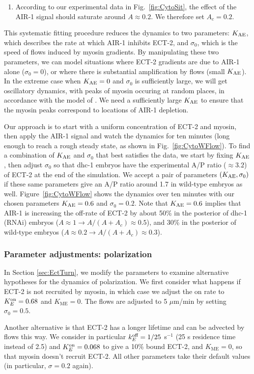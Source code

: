 \documentclass[11pt]{article}
\begin{document}
\begin{appendix}
\begin{enumerate}
\item According to our experimental data in Fig.\ \ref{fig:CytoSit}, the effect of the AIR-1 signal should saturate around $A \approx 0.2$. We therefore set $A_c=0.2$. 
\end{enumerate}
This systematic fitting procedure reduces the dynamics to two parameters: $K_\text{AE}$, which describes the rate at which AIR-1 inhibits ECT-2, and $\sigma_0$, which is the speed of flows induced by myosin gradients. By manipulating these two parameters, we can model situations where ECT-2 gradients are due to AIR-1 alone ($\sigma_0 = 0$), or where there is substantial amplification by flows (small $K_\text{AE}$). In the extreme case when $K_\text{AE}=0$ and $\sigma_0$ is sufficiently large, we will get oscillatory dynamics, with peaks of myosin occuring at random places, in accordance with the model of \cite{michaux2018excitable}. We need a sufficiently large $K_\text{AE}$ to ensure that the myosin peaks correspond to locations of AIR-1 depletion.

Our approach is to start with a uniform concentration of ECT-2 and myosin, then apply the AIR-1 signal and watch the dynamics for ten minutes (long enough to reach a rough steady state, as shown in Fig.\ \ref{fig:CytoWFlow}). To find a combination of $K_\text{AE}$ and $\sigma_0$ that best satisfies the data, we start by fixing $K_\text{AE}$, then adjust $\sigma_0$ so that dhc-1 embryos have the experimental A/P ratio ($\approx 3.2$) of ECT-2 at the end of the simulation. We accept a pair of parameters $\left(K_\text{AE},\sigma_0\right)$ if these same parameters give an A/P ratio around 1.7 in wild-type embryos as well. Figure\ \ref{fig:CytoWFlow} shows the dynamics over ten minutes with our chosen parameters $K_\text{AE}=0.6$ and $\sigma_0=0.2$. Note that $K_\text{AE}=0.6$ implies that AIR-1 is increasing the off-rate of ECT-2 by about 50\% in the posterior of dhc-1 (RNAi) embryos ($A \approx 1 \rightarrow A/(A+A_c) \approx 0.5$), and 30\% in the posterior of wild-type embryos ($A \approx 0.2 \rightarrow A/(A+A_c) \approx 0.3$).

\subsubsection{Parameter adjustments: polarization \label{sec:EctTurnP}}
In Section \ref{sec:EctTurn}, we modify the parameters to examine alternative hypotheses for the dynamics of polarization. We first consider what happens if ECT-2 is not recruited by myosin, in which case we adjust the on rate to $K^\text{on}_E=0.68$ and $K_\text{ME}=0$. The flows are adjusted to 5 $\mu$m/min by setting $\sigma_0=0.5$. 

Another alternative is that ECT-2 has a longer lifetime and can be advected by flows this way. We consider in particular $k^\text{off}_E=1/25$ s$^{-1}$ (25 s residence time instead of 2.5) and $K^\text{on}_E=0.068$ to give a 10\% bound ECT-2, and $K_\text{ME}=0$, so that myosin doesn't recruit ECT-2. All other parameters take their default values (in particular, $\sigma=0.2$ again). 

\end{appendix}




\end{document}
